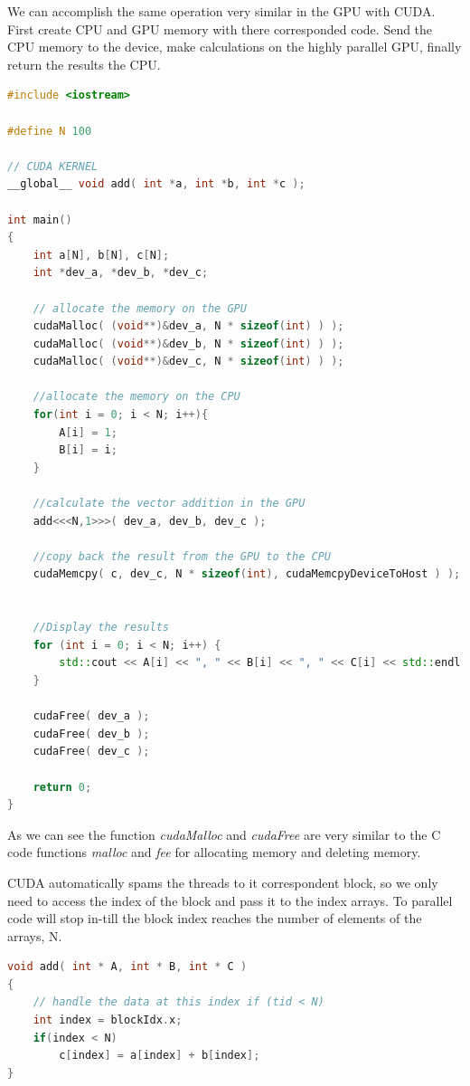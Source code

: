 We can accomplish the same operation very similar in the GPU with CUDA. First create CPU and GPU memory with there corresponded code. Send the CPU memory to the device, make calculations on the highly parallel GPU, finally return the results the CPU.

\begin{lstlisting}[language=C++, caption={GPU Vector Addition}]
#include <iostream>

#define N 100

// CUDA KERNEL
__global__ void add( int *a, int *b, int *c );

int main()
{
    int a[N], b[N], c[N];
    int *dev_a, *dev_b, *dev_c;

    // allocate the memory on the GPU
    cudaMalloc( (void**)&dev_a, N * sizeof(int) ) );
    cudaMalloc( (void**)&dev_b, N * sizeof(int) ) );
    cudaMalloc( (void**)&dev_c, N * sizeof(int) ) );
    
    //allocate the memory on the CPU
    for(int i = 0; i < N; i++){
        A[i] = 1;
        B[i] = i;
    }
    
    //calculate the vector addition in the GPU
    add<<<N,1>>>( dev_a, dev_b, dev_c );
    
    //copy back the result from the GPU to the CPU 
    cudaMemcpy( c, dev_c, N * sizeof(int), cudaMemcpyDeviceToHost ) );
     
     
    //Display the results
    for (int i = 0; i < N; i++) {
        std::cout << A[i] << ", " << B[i] << ", " << C[i] << std::endl;
    }
    
    cudaFree( dev_a );
    cudaFree( dev_b );
    cudaFree( dev_c );
    
    return 0;
}
\end{lstlisting}

As we can see the function \textit{cudaMalloc} and \textit{cudaFree} are very similar to the C code functions \textit{malloc} and \textit{fee} for allocating memory and deleting memory.

CUDA automatically spams the threads to it correspondent block, so we only need to access the index of the block and pass it to the index arrays. To parallel code will stop in-till the block index reaches the number of elements of the arrays, N.

\begin{lstlisting}[language=C++, caption={GPU Vector Addition}]
void add( int * A, int * B, int * C )
{
    // handle the data at this index if (tid < N)
    int index = blockIdx.x; 
    if(index < N)
        c[index] = a[index] + b[index];
}
\end{lstlisting}

